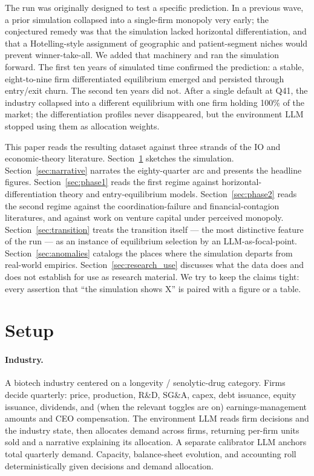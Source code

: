 \documentclass[11pt]{article}
\begin{document}
The run was originally designed to test a specific prediction. In a previous wave, a prior simulation collapsed into a single-firm monopoly very early; the conjectured remedy was that the simulation lacked horizontal differentiation, and that a Hotelling-style assignment of geographic and patient-segment niches would prevent winner-take-all. We added that machinery and ran the simulation forward. The first ten years of simulated time confirmed the prediction: a stable, eight-to-nine firm differentiated equilibrium emerged and persisted through entry/exit churn. The second ten years did not. After a single default at Q41, the industry collapsed into a different equilibrium with one firm holding 100\% of the market; the differentiation profiles never disappeared, but the environment LLM stopped using them as allocation weights.

This paper reads the resulting dataset against three strands of the IO and economic-theory literature. Section~\ref{sec:setup} sketches the simulation. Section~\ref{sec:narrative} narrates the eighty-quarter arc and presents the headline figures. Section~\ref{sec:phase1} reads the first regime against horizontal-differentiation theory and entry-equilibrium models. Section~\ref{sec:phase2} reads the second regime against the coordination-failure and financial-contagion literatures, and against work on venture capital under perceived monopoly. Section~\ref{sec:transition} treats the transition itself --- the most distinctive feature of the run --- as an instance of equilibrium selection by an LLM-as-focal-point. Section~\ref{sec:anomalies} catalogs the places where the simulation departs from real-world empirics. Section~\ref{sec:research_use} discusses what the data does and does not establish for use as research material. We try to keep the claims tight: every assertion that ``the simulation shows X'' is paired with a figure or a table.

\section{Setup}\label{sec:setup}

\paragraph{Industry.} A biotech industry centered on a longevity / senolytic-drug category. Firms decide quarterly: price, production, R\&D, SG\&A, capex, debt issuance, equity issuance, dividends, and (when the relevant toggles are on) earnings-management amounts and CEO compensation. The environment LLM reads firm decisions and the industry state, then allocates demand across firms, returning per-firm units sold and a narrative explaining its allocation. A separate calibrator LLM anchors total quarterly demand. Capacity, balance-sheet evolution, and accounting roll deterministically given decisions and demand allocation.
\end{document}
